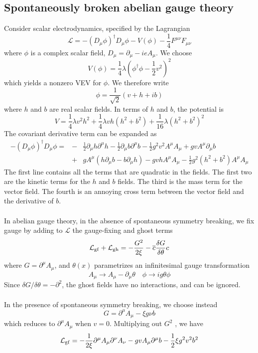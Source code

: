 \subsection{Spontaneously broken abelian gauge theory}
Consider scalar electrodynamics, specified by the Lagrangian
\[\mathcal{L} = -(D_{\mu}\phi)^{\dagger}D_{\mu}\phi - V(\phi) - \frac{1}{4}F^{\mu\nu}F_{\mu\nu}\]
where $\phi$ is a complex scalar field, $D_{\mu} = \partial_{\mu} - ieA_{\mu}$. We choose
\[V(\phi) = \frac{1}{4}\lambda (\phi^{\dagger}\phi - \frac{1}{2}v^2)^2\]
which yields a nonzero VEV for $\phi$. We therefore write
\[\phi = \frac{1}{\sqrt{2}}(v + h + ib)\]
where $h$ and $b$ are real scalar fields. In terms of $h$ and $b$, the potential is
\[V = \frac{1}{4}\lambda v^2 h^2 + \frac{1}{4}\lambda vh(h^2+b^2) + \frac{1}{16}\lambda (h^2+b^2)^2\]
The covariant derivative term can be expanded as
\begin{eqnarray}
-(D_{\mu}\phi)^{\dagger}D_{\mu}\phi = &-& \frac{1}{2}\partial_{\mu}h \partial^{\mu}h -  \frac{1}{2}\partial_{\mu}b \partial^{\mu}b - \frac{1}{2} g^2v^2A^{\mu}A_{\mu} + gv A^{\mu}\partial_{\mu}b \nonumber \\
&+& gA^{\mu} (h\partial_{\mu}b - b\partial_{\mu}h) - gvhA^{\mu}A_{\mu} - \frac{1}{2}g^2(h^2+b^2)A^{\mu}A_{\mu} \nonumber
\end{eqnarray}
The first line contains all the terms that are quadratic in the fields. The first two are the kinetic terms for the $h$ and $b$ fields. The third is the mass term for the vector field. The fourth is an annoying cross term between the vector field and the derivative of $b$.
\\ \\
In abelian gauge theory, in the absence of spontaneous symmetry breaking, we fix gauge by adding to $\mathcal{L}$ the gauge-fixing and ghost terms
\[\mathcal{L}_{\rm gf} + \mathcal{L}_{\rm gh} = - \frac{G^2}{2\xi} - \overline{c}\frac{\delta G}{\delta \theta} c \]
where $G = \partial^{\mu}A_{\mu}$, and $\theta(x)$ parametrizes an infinitesimal gauge transformation
\[A_{\mu} \to A_{\mu} - \partial_{\mu}\theta \quad \phi \to ig\theta\phi\]
Since $\delta G / \delta \theta = - \partial^2$, the ghost fields have no interactions, and can be ignored.
\\ \\
In the presence of spontaneous symmetry breaking, we choose instead
\[G = \partial^{\mu}A_{\mu} - \xi g\nu b\]
which reduces to $\partial^{\mu}A_{\mu}$ when $v = 0$. Multiplying out $G^2$ , we have
\[\mathcal{L}_{\rm gf} = -\frac{1}{2\xi} \partial^{\mu}A_{\mu} \partial^{\nu}A_{\nu} - gvA_{\mu}\partial^{\mu}b - \frac{1}{2}\xi g^2v^2b^2\]
